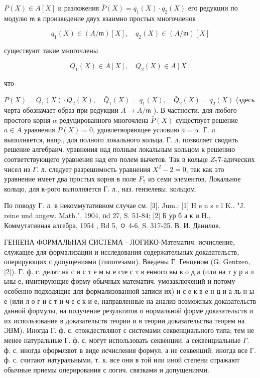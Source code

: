 \documentclass[10pt]{article}
\begin{document}
$P(X) \in A[X]$ и разложения $\bar{P}(X)=q_{1}(X) \cdot q_{2}(X)$ его редукции по модулю $\mathfrak{m}$ в произведение двух взаимно простых многочленов



\[

q_{1}(X) \in(A / \mathfrak{m})[X], \quad q_{2}(X) \in(A / \mathfrak{m})[X]

\]



существуют такие многочлены



\[

Q_{1}(X) \in A[X], \quad Q_{2}(X) \in A[X]

\]



что



$P(X)=Q_{1}(X) \cdot Q_{2}(X), \quad \bar{Q}_{1}(X)=q_{1}(X), \quad \bar{Q}_{2}(X)=q_{2}(X)$ (здесь черта обозначает образ при редукции $A \rightarrow A / \mathfrak{m}$ ). В частности, для любого простого корня $\alpha$ редуцированного многочлена $\bar{P}(X)$ существует решение $a \in A$ уравнения $P(X)=0$, удовлетворяющее условию $\bar{a}=\alpha$. Г. л. выполняется, напр., для полного локального кольца. Г. л. позволяет сводить решение алгебраич. уравнения над полным локальным кольцом к решению соответствующего уравнения над его полем вычетов. Так в кольце $Z_{7} 7$-адических чисел из $\Gamma$. л. следует разрешимость уравнения $X^{2}-2=0$, так как это уравнение имеет два простых корня в поле $F_{7}$ из семи элементов. Локальное кольцо, для к-рого выполняется $Г$. л., наз. гензелевы. кольцом.



По поводу $Г$. л. в некоммутативном случае см. [3]. Jum.: [1] H e n s e l K.. "J. reine und angew. Math.", 1904, пd 27, S. 51-84; [2] Б ур б а к и H., Коммутативная алгебра, 1954 , Bd 5, ㅇ 4-6, S. 317-25. В. И. Данилов.



ГЕНIЕНА ФОРМАЛЬНАЯ СИСТЕМА - ЛОГИКО-Математич. исчисление, служащее для формализации и исследования содержательных доказательств, оперирующих с допущениями (гипотезами). Введены Г. Генценом (G. Gentzen, [2]). Г. ф. с. делят на с и с т е м ы е сте с т в енного вы в о д а (или на т у р а л ьны е, имитирующие форму обычных математич. умозаключений и потому особенно подходящие для формализованной записи их) и с е к в е н ц и а ль н ы е (или л о г и с т и ч е с к и е, направленные на анализ возможных доказательств данной формулы, на получение результатов о нормальной форме доказательств и их использование в доказательств теории и в теории доказательства теорем на ЭВМ). Иногда Г. ф. с. отождествляют с системами секвенциального типа; тем не менее натуральные Г. ф. с. могут использовать секвенции, а секвенциальные $\Gamma$. ф. с. иногда оформляют в виде исчисления формул, а не секвенций; иногда все Г. ф. с. считают натуральными, т. к. все они в той или иной степени отражают обычные приемы оперирования с логич. связками и допущениями.
\end{document}
